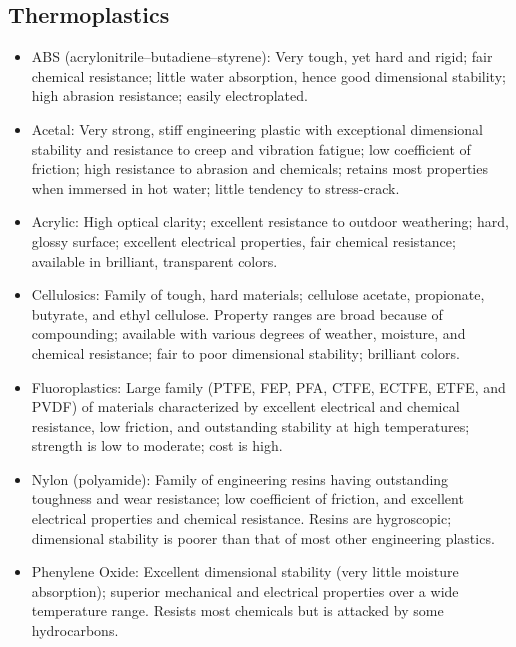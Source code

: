 \documentclass[
10pt,
a4paper,
openany,
svgnames,
]{book}
\begin{document}
\subsection{Thermoplastics}

\begin{itemize}[label=\scriptsize$\square$]

\item ABS (acrylonitrile–butadiene–styrene): Very tough, yet hard and rigid; fair chemical resistance; little water absorption, hence good dimensional stability; high abrasion resistance; easily electroplated.

\item Acetal: Very strong, stiff engineering plastic with exceptional dimensional stability and resistance to creep and vibration fatigue; low coefficient of friction; high resistance to abrasion and chemicals; retains most properties when immersed in hot water; little tendency to stress-crack.

\item Acrylic: High optical clarity; excellent resistance to outdoor weathering; hard, glossy surface; excellent electrical properties, fair chemical resistance; available in brilliant, transparent colors.

\item Cellulosics: Family of tough, hard materials; cellulose acetate, propionate, butyrate, and ethyl cellulose. Property ranges are broad because of compounding; available with various degrees of weather, moisture, and chemical resistance; fair to poor dimensional stability; brilliant colors.

\item Fluoroplastics: Large family (PTFE, FEP, PFA, CTFE, ECTFE, ETFE, and PVDF) of materials characterized by excellent electrical and chemical resistance, low friction, and outstanding stability at high temperatures; strength is low to moderate; cost is high.

\item Nylon (polyamide): Family of engineering resins having outstanding toughness and wear resistance; low coefficient of friction, and excellent electrical properties and chemical resistance. Resins are hygroscopic; dimensional stability is poorer than that of most other engineering plastics. 

\item Phenylene Oxide: Excellent dimensional stability (very little moisture absorption); superior mechanical and electrical properties over a wide temperature range. Resists most chemicals but is attacked by some hydrocarbons.


\end{itemize}
\end{document}
